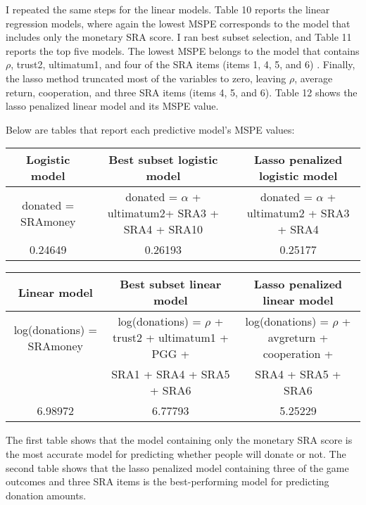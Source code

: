 \documentclass[12pt]{article}
\begin{document}
I repeated the same steps for the linear models. Table 10 reports the linear regression models, where again the lowest MSPE corresponds to the model that includes only the monetary SRA score. I ran best subset selection, and Table 11 reports the top five models. The lowest MSPE belongs to the model that contains \(\rho\), trust2, ultimatum1, and four of the SRA items (items 1, 4, 5, and 6) . Finally, the lasso method truncated most of the variables to zero, leaving \(\rho\), average return, cooperation, and three SRA items (items 4, 5, and 6). Table 12 shows the lasso penalized linear model and its MSPE value.

Below are tables that report each predictive model\rq s MSPE values:

\begin{center}
\begin{adjustbox}{width=\textwidth}
\begin{tabular}{ c | c | c }
\hline \hline
Logistic model & Best subset logistic model & Lasso penalized logistic model \\ 
\hline
\small donated = SRAmoney & donated = \(\alpha\) + ultimatum2+ SRA3 + SRA4 + SRA10 & donated = \(\alpha\) + ultimatum2 + SRA3 + SRA4 \\
 \hline
 0.24649 & 0.26193 & 0.25177 \\  
 \hline \hline
\end{tabular}
\end{adjustbox}
\end{center}
 
\begin{center}
\begin{adjustbox}{width=\textwidth}
\begin{tabular}{ c | c | c }
\hline \hline
Linear model & Best subset linear model & Lasso penalized linear model \\
\hline
log(donations) = SRAmoney & log(donations) = \(\rho\) + trust2 + ultimatum1 + PGG + & log(donations) = \(\rho\) + avgreturn + cooperation + \\
\small & SRA1 + SRA4 + SRA5 + SRA6 & SRA4 + SRA5 + SRA6 \\
\hline
6.98972 & 6.77793 & 5.25229 \\
\hline \hline
\end{tabular}
\end{adjustbox}
\end{center}


\vspace{5mm} The first table shows that the model containing only the monetary SRA score is the most accurate model for predicting whether people will donate or not. The second table shows that the lasso penalized model containing three of the game outcomes and three SRA items is the best-performing model for predicting donation amounts. 
\end{document}
